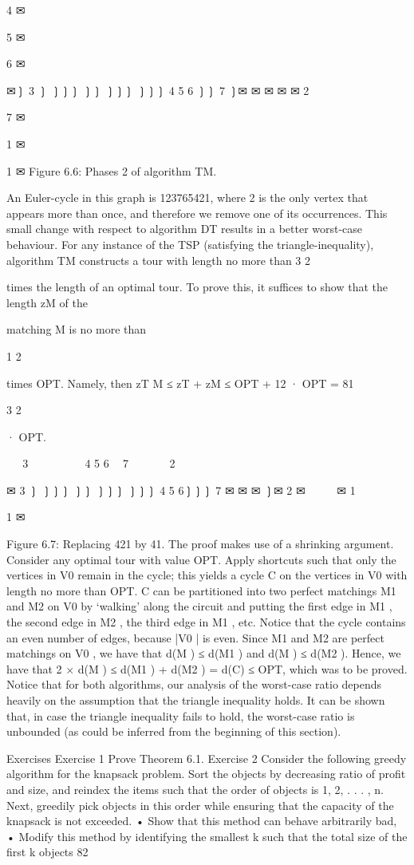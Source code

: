 \documentclass[titlepage]{book}
\theoremstyle{plain}
\theoremstyle{definition}
\theoremstyle{remark}
\begin{document}
4
✉

5
✉

6
✉

✉❳
3 ❳
❳❳❳
❳❳
❳❳❳
❳❳❳
4
5
6 ❳❳ 7
❳✉
✉
✉
✉
✉
2

7
✉

1 ✉

1 ✉
Figure 6.6: Phases 2 of algorithm TM.

An Euler-cycle in this graph is 123765421, where 2 is the only vertex that appears more than once, and
therefore we remove one of its occurrences.
This small change with respect to algorithm DT results in a better worst-case behaviour. For any instance
of the TSP (satisfying the triangle-inequality), algorithm TM constructs a tour with length no more than
3
2

times the length of an optimal tour. To prove this, it suffices to show that the length zM of the

matching M is no more than

1
2

times OPT. Namely, then zT M ≤ zT + zM ≤ OPT + 12 · OPT =
81

3
2

· OPT.

❳❳❳
3 ✉
❳❳
❳❳❳
❳❳
❳❳❳
4
5
6 ❳❳ 7
✉
✉
✉
✉
❳✉
2

✉
3 ❳
❳❳❳
❳❳
❳❳❳
❳❳❳
4
5
6❳❳❳ 7
✉
✉
✉
❳✉
2 ✉
 
 
 
✉
1  

1 ✉

Figure 6.7: Replacing 421 by 41.
The proof makes use of a shrinking argument. Consider any optimal tour with value OPT. Apply
shortcuts such that only the vertices in V0 remain in the cycle; this yields a cycle C on the vertices in
V0 with length no more than OPT. C can be partitioned into two perfect matchings M1 and M2 on V0
by ‘walking' along the circuit and putting the first edge in M1 , the second edge in M2 , the third edge in
M1 , etc. Notice that the cycle contains an even number of edges, because |V0 | is even.
Since M1 and M2 are perfect matchings on V0 , we have that d(M ) ≤ d(M1 ) and d(M ) ≤ d(M2 ). Hence,
we have that 2 × d(M ) ≤ d(M1 ) + d(M2 ) = d(C) ≤ OPT, which was to be proved.
Notice that for both algorithms, our analysis of the worst-case ratio depends heavily on the assumption
that the triangle inequality holds. It can be shown that, in case the triangle inequality fails to hold, the
worst-case ratio is unbounded (as could be inferred from the beginning of this section).

Exercises
Exercise 1
Prove Theorem 6.1.
Exercise 2
Consider the following greedy algorithm for the knapsack problem. Sort the objects by decreasing ratio
of profit and size, and reindex the items such that the order of objects is 1, 2, . . . , n. Next, greedily pick
objects in this order while ensuring that the capacity of the knapsack is not exceeded.
• Show that this method can behave arbitrarily bad,
• Modify this method by identifying the smallest k such that the total size of the first k objects
82
\end{document}
